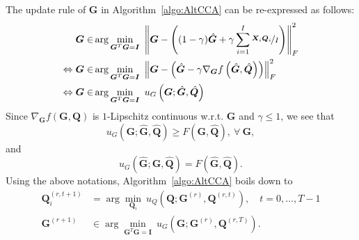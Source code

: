 \documentclass[10pt,journal]{IEEEtran}
\newcommand{\G}{\boldsymbol{G}}
\newcommand{\Q}{\boldsymbol{Q}}
\newcommand{\X}{\boldsymbol{X}}
\begin{document}
The update rule of $\G$ in Algorithm~\ref{algo:AltCCA} can be re-expressed as follows:
\begin{align*}
 \G \in & \arg\min_{\G^T\G={\bm I}}~\left\|\G - \left((1-\gamma)\hat{\G}+\gamma \sum_{i=1}^I\nicefrac{\X_i\Q_i}{I}\right)\right\|_F^2 \\
\Leftrightarrow  \G  \in & \arg\min_{\G^T\G={\bm I}}~\left\|\G - \left(\hat{\G}-\gamma \nabla_{\G} f\left(\hat{\bm G},\hat{\bm Q}\right)\right)\right\|_F^2\\
\Leftrightarrow   \G  \in & \arg\min_{\G^T\G={\bm I}}~u_G\left(\G;\hat{\bm G},\hat{\bm Q}\right)
\end{align*}
Since $\nabla_{\G} f({\bm G},{\bm Q})$ is $1$-Lipschitz continuous w.r.t. $\G$ and $\gamma\leq 1$, we see that
\begin{equation}\label{eq:ugleqf}
	u_G\left({\bm G};\hat{\bm G},\hat{\bm Q}\right)\geq F\left({\bm G},\hat{\bm Q}\right),~\forall~{\bm G},
\end{equation}
and
\begin{equation}\label{eq:ugeqf}
	u_G\left(\hat{\bm G};\hat{\bm G},\hat{\bm Q}\right)= F\left(\hat{\bm G},\hat{\bm Q}\right).
\end{equation}
Using the above notations, Algorithm~\ref{algo:AltCCA} boils down to
\begin{subequations}
\begin{align}
{\bm Q}_i^{(r,t+1)}&= \arg\min_{{\bm Q}_i}~u_{Q}\left( {\bm Q};{\bm G}^{(r)},{\bm Q}^{(r,t)} \right),\quad t=0,\ldots, T-1 \label{eq:q_update_u}\\
\G^{(r+1)} &\in \arg\min_{\G^T\G={\bm I}}~u_G\left(\G;{\bm G}^{(r)},{\bm Q}^{(r,T)}\right). \label{eq:g_update_u}
\end{align}
\end{subequations}

\bigskip
\end{document}

